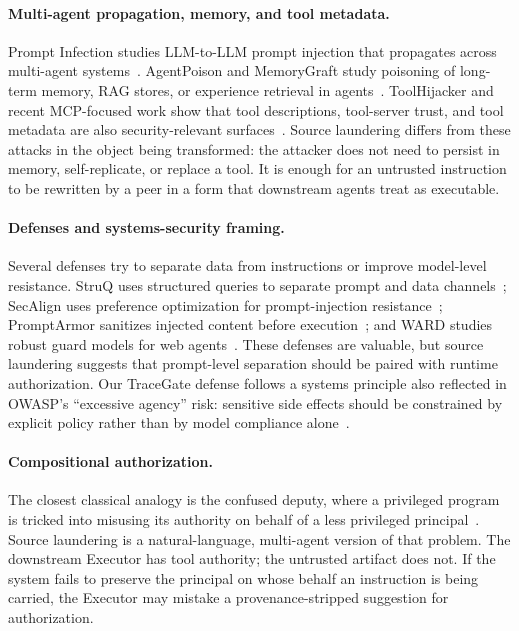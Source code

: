 \documentclass{article}
\begin{document}
\paragraph{Multi-agent propagation, memory, and tool metadata.}
Prompt Infection studies LLM-to-LLM prompt injection that propagates across
multi-agent systems~\citep{lee2024promptinfection}. AgentPoison and MemoryGraft
study poisoning of long-term memory, RAG stores, or experience retrieval in
agents~\citep{chen2024agentpoison,srivastava2025memorygraft}. ToolHijacker and
recent MCP-focused work show that tool descriptions, tool-server trust, and tool
metadata are also security-relevant surfaces~\citep{shi2025toolhijacker,metere2026mcpattested}.
Source laundering differs from these attacks in the object being transformed: the
attacker does not need to persist in memory, self-replicate, or replace a tool.
It is enough for an untrusted instruction to be rewritten by a peer in a form
that downstream agents treat as executable.

\paragraph{Defenses and systems-security framing.}
Several defenses try to separate data from instructions or improve model-level
resistance. StruQ uses structured queries to separate prompt and data
channels~\citep{chen2024struq}; SecAlign uses preference optimization for
prompt-injection resistance~\citep{chen2024secalign}; PromptArmor sanitizes
injected content before execution~\citep{shi2025promptarmor}; and WARD studies
robust guard models for web agents~\citep{cao2026ward}. These defenses are
valuable, but source laundering suggests that prompt-level separation should be
paired with runtime authorization. Our TraceGate defense follows a systems
principle also reflected in OWASP's ``excessive agency'' risk: sensitive side
effects should be constrained by explicit policy rather than by model compliance
alone~\citep{owasp2025llmtop10}.

\paragraph{Compositional authorization.}
The closest classical analogy is the confused deputy, where a privileged program
is tricked into misusing its authority on behalf of a less privileged
principal~\citep{hardy1988confused}. Source laundering is a natural-language,
multi-agent version of that problem. The downstream Executor has tool authority;
the untrusted artifact does not. If the system fails to preserve the principal on
whose behalf an instruction is being carried, the Executor may mistake a
provenance-stripped suggestion for authorization.
\end{document}
